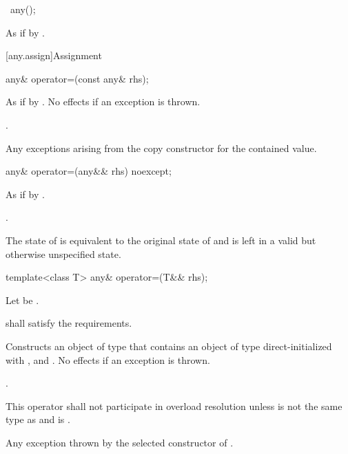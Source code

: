 \begin{itemdecl}
~any();
\end{itemdecl}

\begin{itemdescr}
\pnum
\effects
As if by .
\end{itemdescr}

[any.assign]{Assignment}

%
\begin{itemdecl}
any& operator=(const any& rhs);
\end{itemdecl}

\begin{itemdescr}
\pnum
\effects
As if by .
No effects if an exception is thrown.

\pnum
\returns
{}.

\pnum
\throws
Any exceptions arising from the copy constructor for the contained value.
\end{itemdescr}

%
\begin{itemdecl}
any& operator=(any&& rhs) noexcept;
\end{itemdecl}

\begin{itemdescr}
\pnum
\effects
As if by .

\pnum
\returns
{}.

\pnum
\postconditions
The state of  is equivalent to the original state of 
and  is left in a valid but otherwise unspecified state.
\end{itemdescr}

%
\begin{itemdecl}
template<class T>
  any& operator=(T&& rhs);
\end{itemdecl}

\begin{itemdescr}
\pnum
Let  be .

\pnum
\requires
{} shall satisfy the  requirements.

\pnum
\effects
Constructs an object  of type  that contains an object of type  direct-initialized with , and .
No effects if an exception is thrown.

\pnum
\returns
{}.

\pnum
\remarks
This operator shall not participate in overload resolution unless
 is not the same type as  and
 is .

\pnum
\throws
Any exception thrown by the selected constructor of .
\end{itemdescr}

